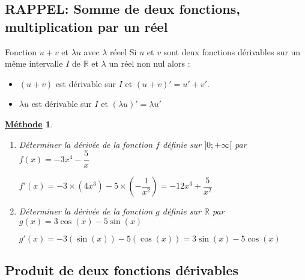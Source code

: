 \documentclass[11pt,a4paper]{article}
\def\R{{\mathbb R}}
\theoremstyle{break}
\newtheorem{Meth}{\underline{Méthode}}
\begin{document}
	\subsection{RAPPEL: Somme de deux fonctions, multiplication par un réel}
\begin{bclogo}[couleur = yellow!30, arrondi = 0.1,logo=\bcbook]{Fonction $u+v$ et $\lambda u$ avec $\lambda$ réeel}
	Si $u$ et $v$ sont deux fonctions dérivables sur un même intervalle $I$ de $\R$ et $\lambda$ un réel non nul alors :
	\begin{itemize}
		\item $(u+v)$ est dérivable sur $I$ et $(u+v)'=u'+v'$.
		\item $\lambda u$ est dérivable sur  $I$ et $(\lambda u)'= \lambda u'$
	\end{itemize} 
\end{bclogo}
\begin{Meth}
	\begin{enumerate}
		\item Déterminer la dérivée de la fonction $f$ définie sur $]0;+\infty[$ par $f(x)=-3x^4-\dfrac5x$\par
		$f'(x) = -3 \times (4x^3) -5 \times	(-\dfrac{1}{x^2}) = -12x^3 + \dfrac{5}{x^2}$
		\item Déterminer la dérivée de la fonction $g$ définie sur $\R$ par $g(x)=3\cos(x)-5\sin(x)$\par
		$g'(x) = -3 (\sin(x)) -5 (\cos(x)) = 3\sin(x) - 5\cos(x)$
	\end{enumerate}
	
\end{Meth} 
\newpage
\subsection{Produit de deux fonctions dérivables}
\end{document}
